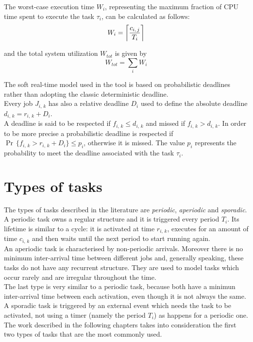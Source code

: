 The worst-case execution time \( W_{i} \), representing the maximum fraction of CPU time spent to execute the task \( \tau_{i} \), can be calculated as follows:
\begin{equation*}
  W_{i} = \ceil[\bigg]{\frac{c_{i,\,j}}{T_{i}}}
\end{equation*}

and the total system utilization \( W_{tot} \) is given by
\begin{equation*}
  W_{tot} = \displaystyle\sum_{i} W_{i}
\end{equation*}

The soft real-time model used in the tool is based on probabilistic deadlines rather than adopting the classic deterministic deadline.\\
Every job \( J_{i,\,k} \) has also a relative deadline \( D_{i} \) used to define the absolute deadline \( d_{i,\,k} = r_{i,\,k} + D_{i} \). \\
A deadline is said to be respected if \( f_{i,\,k} \leq d_{i,\,k} \) and missed if \( f_{i,\,k} > d_{i,\,k} \). In order to be more precise a probabilistic deadline is respected if \( \Pr\,\{f_{i,\,k} > r_{i,\,k} + D_{i} \} \leq p_{i} \), otherwise it is missed. The value \( p_{i} \) represents the probability to meet the deadline associated with the task \( \tau_{i} \).

\section{Types of tasks}
The types of tasks described in the literature are \emph{periodic}, \emph{aperiodic} and \emph{sporadic}.\\
A periodic task owns a regular structure and it is triggered every period \( T_{i} \). Its lifetime is similar to a cycle: it is activated at time \( r_{i,\,k} \), executes for an amount of time \( c_{i,\,k} \) and then waits until the next period to start running again.\\
An aperiodic task is characterised by non-periodic arrivals. Moreover there is no minimum inter-arrival time between different jobs and, generally speaking, these tasks do not have any recurrent structure. They are used to model tasks which occur rarely and are irregular throughout the time.\\
The last type is very similar to a periodic task, because both have a minimun inter-arrival time between each activation, even though it is not always the same. A sporadic task is triggered by an external event which needs the task to be activated, not using a timer (namely the period \( T_{i} \)) as happens for a periodic one.\\
The work described in the following chapters takes into consideration the first two types of tasks that are the most commonly used.

